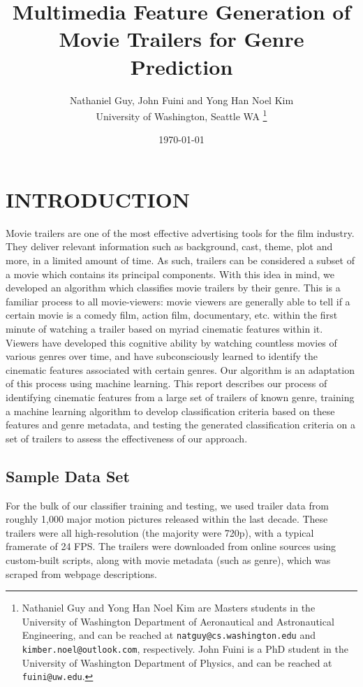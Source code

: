 \documentclass[letterpaper, 10 pt, conference]{ieeeconf}  %
\title{\LARGE \bf
Multimedia Feature Generation of Movie Trailers for Genre Prediction\\
}
\author{Nathaniel Guy, John Fuini and Yong Han Noel Kim\\
	University of Washington, Seattle WA%
\thanks{Nathaniel Guy and Yong Han Noel Kim are Masters students in the University of Washington Department of Aeronautical and Astronautical Engineering, and can be reached at {\tt\small natguy@cs.washington.edu} and {\tt\small kimber.noel@outlook.com}, respectively. John Fuini is a PhD student in the University of Washington Department of Physics, and can be reached at {\tt\small fuini@uw.edu}. }%
}
\date{ \today}
\begin{document}
\maketitle
\thispagestyle{empty}
\pagestyle{empty}

\begin{abstract}



\end{abstract}

\section{INTRODUCTION}
Movie trailers are one of the most effective advertising tools for the film industry. They deliver relevant information such as background, cast, theme, plot and more, in a limited amount of time. As such, trailers can be considered a subset of a movie which contains its principal components. With this idea in mind, we developed an algorithm which classifies movie trailers by their genre. This is a familiar process to all movie-viewers: movie viewers are generally able to tell if a certain movie is a comedy film, action film, documentary, etc. within the first minute of watching a trailer based on myriad cinematic features within it. Viewers have developed this cognitive ability by watching countless movies of various genres over time, and have subconsciously learned to identify the cinematic features associated with certain genres. Our algorithm is an adaptation of this process using machine learning. This report describes our process of identifying cinematic features from a large set of trailers of known genre, training a machine learning algorithm to develop classification criteria based on these features and genre metadata, and testing the generated classification criteria on a set of trailers to assess the effectiveness of our approach.

\subsection{Sample Data Set}

For the bulk of our classifier training and testing, we used trailer data from roughly 1,000 major motion pictures released within the last decade. These trailers were all high-resolution (the majority were 720p), with a typical framerate of 24 FPS. The trailers were downloaded from online sources using custom-built scripts, along with movie metadata (such as genre), which was scraped from webpage descriptions.
\end{document}
